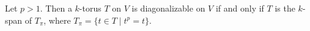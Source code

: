 Let $p > 1$. Then a $k$-torus $T$ on $V$ is diagonalizable on $V$ if and only if $T$ is the $k$-span of $T_\pi$, where $T_\pi = \{t \in T \mid t^p = t\}$.
